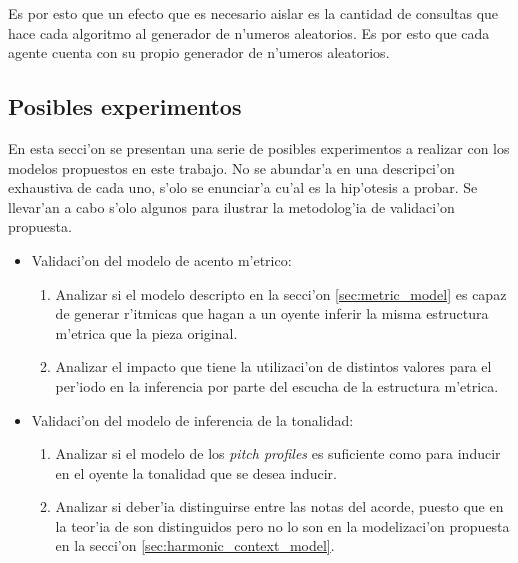 Es por esto que un efecto que es necesario aislar es la cantidad de consultas que hace cada algoritmo al
generador de n'umeros aleatorios. Es por esto que cada agente cuenta con su propio generador de n'umeros aleatorios.

\subsection{Posibles experimentos}
En esta secci'on se presentan una serie de posibles experimentos a realizar con los modelos propuestos en este trabajo. 
No se abundar'a en una descripci'on exhaustiva de cada uno, s'olo se enunciar'a cu'al es la hip'otesis a probar.
Se llevar'an a cabo s'olo algunos para ilustrar la metodolog'ia de validaci'on propuesta.

\begin{itemize}
  \item Validaci'on del modelo de acento m'etrico:
    \begin{enumerate}
      \item Analizar si el modelo descripto en la secci'on \ref{sec:metric_model} es capaz de generar r'itmicas que hagan a un oyente inferir la misma 
            estructura m'etrica que la pieza original. 
      \item Analizar el impacto que tiene la utilizaci'on de distintos valores para el per'iodo en la inferencia por parte del escucha de la estructura m'etrica.

    \end{enumerate}

  \item Validaci'on del modelo de inferencia de la tonalidad: 
    \begin{enumerate}
      \item Analizar si el modelo de los \emph{pitch profiles} es suficiente como para inducir en el oyente la tonalidad que se desea inducir. 
      \item Analizar si deber'ia distinguirse entre las notas del acorde, puesto que en la teor'ia de \cite{Lerdahl2001} son distinguidos pero no lo son en 
      la modelizaci'on propuesta en la secci'on \ref{sec:harmonic_context_model}.
    \end{enumerate}


\end{itemize}
